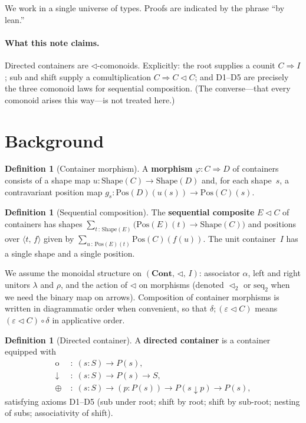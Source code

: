 \documentclass[11pt,a4paper]{article}
\theoremstyle{plain}
\theoremstyle{definition}
\newtheorem{definition}[theorem]{Definition}
\newcommand{\Shape}{\mathrm{Shape}}
\newcommand{\Pos}{\mathrm{Pos}}
\newcommand{\Cont}{\mathbf{Cont}}
\newcommand{\rootp}{\mathrm{o}}
\begin{document}
We work in a single universe of types. Proofs are indicated by the phrase
``by lean.''

\paragraph{What this note claims.}
Directed containers are $\triangleleft$-comonoids. Explicitly: the root
supplies a counit $C \Rightarrow I$; sub and shift supply a comultiplication
$C \Rightarrow C \mathbin{\triangleleft} C$; and D1--D5 are precisely the three
comonoid laws for sequential composition. (The converse---that every comonoid
arises this way---is not treated here.)

\section{Background}

\begin{definition}[Container morphism]
A \textbf{morphism} $\varphi : C \Rightarrow D$ of containers consists of a
shape map $u : \Shape(C) \to \Shape(D)$ and, for each shape~$s$, a
contravariant position map
$g_s : \Pos(D)(u(s)) \to \Pos(C)(s)$.
\end{definition}

\begin{definition}[Sequential composition]\label{def:seq}
The \textbf{sequential composite} $E \mathbin{\triangleleft} C$ of containers
has shapes $\sum_{t \,:\, \Shape(E)} \bigl(\Pos(E)(t) \to \Shape(C)\bigr)$
and positions over $\langle t,\, f\rangle$ given by
$\sum_{u \,:\, \Pos(E)(t)} \Pos(C)(f(u))$. The unit container~$I$ has a
single shape and a single position.
\end{definition}

We assume the monoidal structure on $(\Cont,\, \triangleleft,\, I)$:
associator $\alpha$, left and right unitors $\lambda$ and $\rho$, and the
action of $\triangleleft$ on morphisms (denoted $\triangleleft_2$ or
$\mathrm{seq}_2$ when we need the binary map on arrows). Composition of
container morphisms is written in diagrammatic order when convenient, so that
$\delta ; (\varepsilon \mathbin{\triangleleft} C)$ means
$(\varepsilon \mathbin{\triangleleft} C) \circ \delta$ in applicative order.

\begin{definition}[Directed container]
A \textbf{directed container} is a container equipped with
\begin{align*}
  \rootp &\;:\; (s : S) \to P(s), \\
  \downarrow &\;:\; (s : S) \to P(s) \to S, \\
  \oplus &\;:\; (s : S) \to (p : P(s)) \to P(s \downarrow p) \to P(s),
\end{align*}
satisfying axioms D1--D5 (sub under root; shift by root; shift by sub-root;
nesting of subs; associativity of shift).
\end{definition}
\end{document}

